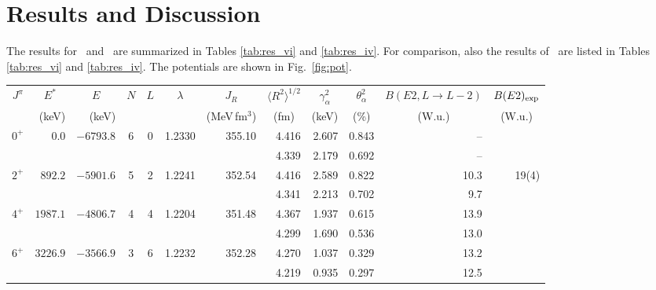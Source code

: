 \section{Results and Discussion}
\label{sec:res}
%
The results for \crvi\ and \criv\ are summarized in Tables \ref{tab:res_vi}
and \ref{tab:res_iv}. For comparison, also the results of \SM\ are listed in
Tables \ref{tab:res_vi} and \ref{tab:res_iv}. The potentials are shown in
Fig.~\ref{fig:pot}.
%
\begin{table*}
\caption{\al -cluster properties of \crvi . For comparison, the second line
  for each state shows the results of \SM\ \cite{Sou17} . Experimental data
  have been taken from the ENSDF database \cite{ENSDF} which is based on
  \cite{NDS46} for \crvi . 
}
\label{tab:res_vi}
\begin{center}
\begin{tabular}{crrccrrrrrrr}
\hline
$J^\pi$ 
& \multicolumn{1}{c}{$E^\ast$} 
& \multicolumn{1}{c}{$E$} 
& $N$ & $L$ 
& \multicolumn{1}{c}{$\lambda$}
& \multicolumn{1}{c}{$J_R$} 
& \multicolumn{1}{c}{$\langle R^{2} \rangle^{1/2}$}
& \multicolumn{1}{c}{$\gamma_\alpha^2$}
& \multicolumn{1}{c}{$\theta_\alpha^2$}
& \multicolumn{1}{c}{$B(E2,L\rightarrow L-2)$}
& \multicolumn{1}{c}{$B(E2)_{\rm{exp}}$} \\
%
& (keV)
& (keV)
& & 
& 
& \multicolumn{1}{c}{(MeV\,fm$^3$)} 
& \multicolumn{1}{c}{(fm)}
& \multicolumn{1}{c}{(keV)}
& \multicolumn{1}{c}{(\%)}
& \multicolumn{1}{c}{(W.u.)}
& \multicolumn{1}{c}{(W.u.)} \\
%
\hline
%
$0^+$   &       $0.0$   &  $-6793.8$  &  6  &   0 & 1.2330  & 355.10 
&  4.416  & 2.607  & 0.843  & -- \\
& & & & & &
&  4.339  & 2.179  & 0.692  & -- \\
%
$2^+$   &     $892.2$   &  $-5901.6$  &  5  &   2 & 1.2241  & 352.54 
&  4.416  & 2.589  & 0.822  & 10.3 & 19(4)\\
& & & & & &
&  4.341  & 2.213  & 0.702  & 9.7 \\
%
$4^+$   &    $1987.1$   &  $-4806.7$  &  4  &   4 & 1.2204  & 351.48 
&  4.367  & 1.937  & 0.615  & 13.9 & \\
& & & & & &
&  4.299  & 1.690  & 0.536  & 13.0 \\
%
$6^+$   &    $3226.9$   &  $-3566.9$  &  3  &   6 & 1.2232  & 352.28 
&  4.270  & 1.037  & 0.329  & 13.2 & \\
& & & & & &
&  4.219  & 0.935  & 0.297  & 12.5 \\

\end{tabular}
\end{center}
\end{table*}
